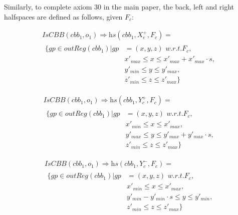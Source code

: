 \documentclass{article}
\begin{document}
Similarly, to complete axiom 30 in the main paper, the back, left and right halfspaces are defined as follows, given $F_c$:

\begin{multline}
    \textit{IsCBB}(cbb_1,o_1) \Rightarrow \textit{hs}(cbb_1,X_{c}^{+},F_c) = \\
\begin{split}
    \{gp \in \textit{outReg}(cbb_1) | gp &{} =(x,y,z) \textit{ w.r.t.} F_c,  \\
  &  x'_{max}  \leq x \leq x'_{max} + x'_{max} \cdot s, \\
  &  y'_{min} \leq y \leq y'_{max}, \\
  &  z'_{min} \leq z \leq z'_{max}
    \} \end{split}
\end{multline}

\begin{multline}
    \textit{IsCBB}(cbb_1,o_1) \Rightarrow \textit{hs}(cbb_1,Y_{c}^{+},F_c) = \\
\begin{split}
    \{gp \in \textit{outReg}(cbb_1) | gp &{} =(x,y,z) \textit{ w.r.t.} F_c,  \\
  &  x'_{min}  \leq x \leq x'_{max}, \\
  &  y'_{max} \leq y \leq y'_{max} + y'_{max} \cdot s, \\
  &  z'_{min} \leq z \leq z'_{max}
    \} \end{split}
\end{multline}

\begin{multline}
    \textit{IsCBB}(cbb_1,o_1) \Rightarrow \textit{hs}(cbb_1,Y_{c}^{-},F_c) = \\
\begin{split}
    \{gp \in \textit{outReg}(cbb_1) | gp &{} =(x,y,z) \textit{ w.r.t.} F_c,  \\
  &  x'_{min}  \leq x \leq x'_{max}, \\
  &  y'_{min} - y'_{min} \cdot s\leq y \leq y'_{min} , \\
  &  z'_{min} \leq z \leq z'_{max}
    \} \end{split}
\end{multline}
\end{document}

